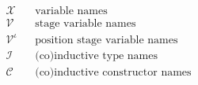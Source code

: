 \begin{align*}
&\mathcal{X}       && \text{variable names} \\
&\mathcal{V}       && \text{stage variable names} \\
&\mathcal{V}^\iota && \text{position stage variable names} \\
&\mathcal{I}       && \text{(co)inductive type names} \\
&\mathcal{C}       && \text{(co)inductive constructor names} \\
\end{align*}